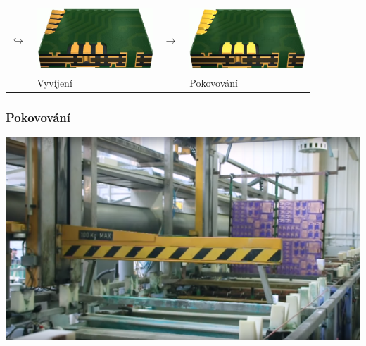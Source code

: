 \documentclass{beamer}
\begin{document}
\begin{frame}
\begin{center}
\begin{tabular}{m{0.05\linewidth} m{0.38\linewidth} m{0.05\linewidth} m{0.38\linewidth}}
		 \Large\textbf{$\hookrightarrow$} & \includegraphics[scale=0.12]{maskaHotovo.png} & \Large\textbf{$\rightarrow$} & \includegraphics[scale=0.12]{Pokoveni.png}\\
		& Vyvíjení & & Pokovování
		\end{tabular}
	\end{center}
\end{frame}
\begin{frame}
	\frametitle{Pokovování}

	\begin{center}
		\includegraphics[scale=0.2]{procesProkovovani.png}
	\end{center}
	
\end{frame}
\end{document}
